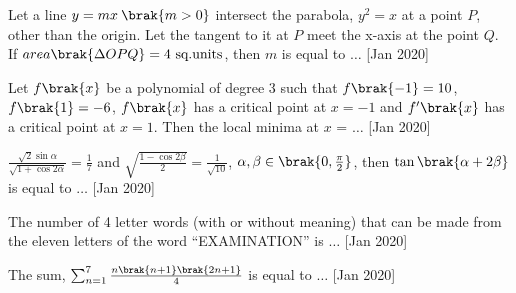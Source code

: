 \iffalse
    \title{2020}
    \author{AI24BTECH11030}
    \section{integer}
\fi


    \item Let a line $y = mx \: \brak{m > 0}$ intersect the parabola, $y^2 = x$ at a point $P$, other than the origin. Let the tangent to it at $P$ meet the x-axis at the point $Q$. If $area\brak{\Delta OPQ} = 4 \text{ sq.units}$, then $m$ is equal to $\ldots$ \hfill [Jan 2020]\\
    
    \item Let $f\brak{x}$ be a polynomial of degree 3 such that $f\brak{-1} = 10$, $f\brak{1} = -6$, $f\brak{x}$ has a critical point at $x = -1$ and $f^\prime\brak{x}$ has a critical point at $x = 1$. Then the local minima at $x$ = $\ldots$ \hfill [Jan 2020]\\
    
    \item $\frac{\sqrt{2}\sin\alpha}{\sqrt{1 + \cos2\alpha}} = \frac{1}{7}$ and $\sqrt{\frac{1-\cos2\beta}{2}} = \frac{1}{\sqrt{10}}$, $\alpha, \beta \in \brak{0, \frac{\pi}{2}}$, then $\tan\brak{\alpha + 2\beta}$ is equal to $\ldots$ \hfill [Jan 2020]\\
    
    \item The number of 4 letter words (with or without meaning) that can be made from the eleven letters of the word ``EXAMINATION'' is $\ldots$ \hfill [Jan 2020]\\
    
    \item The sum, $\sum_{n=1}^{7}\frac{n\brak{n+1}\brak{2n+1}}{4}$ is equal to $\ldots$ \hfill [Jan 2020]\\
